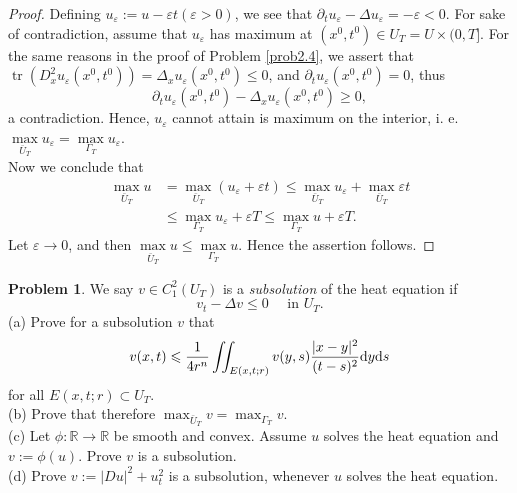 \documentclass[hyperref,UTF8,12pt]{article}
\numberwithin{equation}{subsection}
\theoremstyle{plain}
\theoremstyle{definition}
\newtheorem{problem}{Problem}
\numberwithin{theorem}{section}
\numberwithin{lemma}{section}
\numberwithin{proposition}{section}
\numberwithin{remark}{section}
\numberwithin{corollary}{section}
\numberwithin{definition}{section}
\numberwithin{problem}{section}
\numberwithin{example}{section}
\def\dif{\textup{d}}
\newcommand{\ptl}{\partial}
\newcommand{\mr}{\mathbb{R}}
\renewcommand{\leq}{\leqslant}
\renewcommand{\geq}{\geqslant}
\newcommand{\tr}{\operatorname{tr}}
\newcommand{\ve}{\varepsilon}
\begin{document}
\begin{proof}
Defining $u_\ve:=u-\ve t(\ve>0)$, we see that $\ptl_tu_\ve-\Delta u_\ve=-\ve<0$. For sake of contradiction, assume that $u_\ve$ has maximum at $(x^0,t^0)\in U_T=U\times(0,T]$. For the same reasons in the proof of Problem \ref{prob2.4}, we assert that  $\tr(D_x^2u_{\ve}(x^0,t^0))=\Delta_xu_{\ve}(x^0,t^0)\leq0$, and $\ptl_tu_\ve (x^0,t^0)=0$, thus \[\ptl_tu_\ve(x^0,t^0)-\Delta_xu_\ve(x^0,t^0)\geq0,\]a contradiction. Hence, $u_\ve$ cannot attain is maximum on the interior, i. e. $\max\limits_{\bar{U}_T}u_\ve=\max\limits_{\Gamma_T}u_\ve$.\\
Now we conclude that\[\begin{aligned}
	\max_{\bar{U}_T}u&=\max_{\bar{U}_T}(u_\ve+\ve t)\leq\max_{\bar{U}_T} u_\ve+\max_{\bar{U}_T}\ve t\\
	&\leq\max_{\Gamma_T}u_\ve+\ve T\leq\max_{\Gamma_T}u+\ve T.
\end{aligned}\]Let $\ve\to0$, and then $\max\limits_{\bar{U}_T}u\leq\max\limits_{\Gamma_T}u$. Hence the assertion follows.
\end{proof}
\begin{problem}\label{prob2.17}
We say $v \in C_1^2(U_T)$ is a \textit{subsolution} of the heat equation if
\[v_t-\Delta v\leq0\quad\text{ in }U_T.\]
(a) Prove for a subsolution $v$ that
\[v(x,t)\leq\frac{1}{4r^n}\iint_{E(x,t;r)}v(y,s)\frac{|x-y|^2}{(t-s)^2}\dif y\dif s\]for all $E(x,t;r)\subset U_T$.\\
(b) Prove that therefore $\max_{\bar{U}_T}v=\max_{\Gamma_T}v$.\\
(c) Let $\phi:\mr\to\mr$ be smooth and convex. Assume $u$ solves the heat equation and $v:=\phi(u)$. Prove $v$ is a subsolution.\\
(d) Prove $v:=|Du|^2+u_t^2$ is a subsolution, whenever $u$ solves the heat equation.
\end{problem}
\end{document}
